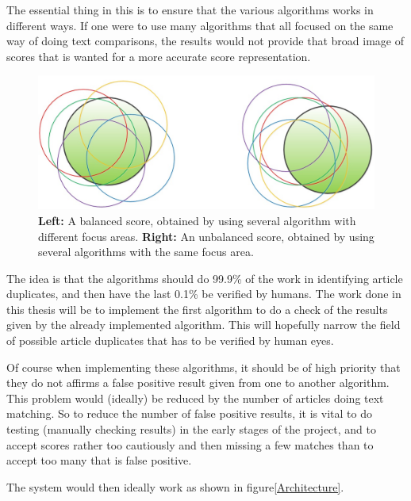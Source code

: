 The essential thing in this is to ensure that the various algorithms works in different ways. If one were to use many algorithms that all focused on the same way of doing text comparisons, the results would not provide that broad image of scores that is wanted for a more accurate score representation.

\begin{figure}
	\centering
	\includegraphics[scale=0.3]{figures/MultipleAlgoScores}
	\caption{\textbf{Left:} A balanced score, obtained by using several algorithm with different focus areas. \textbf{Right:} An unbalanced score, obtained by using several algorithms with the same focus area\cite{Slides}.}
	\label{MultipleAlgo}
\end{figure}

The idea is that the algorithms should do 99.9\% of the work in identifying article duplicates, and then have the  last 0.1\% be verified by humans. The work done in this thesis will be to implement the first algorithm to do a check of the results given by the already implemented algorithm. This will hopefully narrow the field of possible article duplicates that has to be verified by human eyes.

Of course when implementing these algorithms, it should be of high priority that they do not affirms a false positive result given from one to another algorithm. This problem would (ideally) be reduced by the number of articles doing text matching. So to reduce the number of false positive results, it is vital to do testing (manually checking results) in the early stages of the project, and to accept scores rather too cautiously and then missing a few matches than to accept too many that is false positive.

The system would then ideally work as shown in figure\ref{Architecture}.

